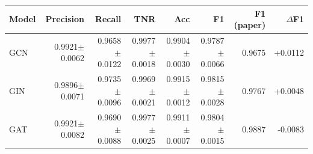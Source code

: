 \begin{tabular}{@{}lrrrrrrr@{}}
\toprule
Model & Precision & Recall & TNR & Acc & F1 & F1 (paper) & $\Delta$F1 \\ \midrule
GCN & 0.9921$\pm$0.0062 & 0.9658$\pm$0.0122 & 0.9977$\pm$0.0018 & 0.9904$\pm$0.0030 & 0.9787$\pm$0.0066 & 0.9675 & +0.0112 \\
GIN & 0.9896$\pm$0.0071 & 0.9735$\pm$0.0096 & 0.9969$\pm$0.0021 & 0.9915$\pm$0.0012 & 0.9815$\pm$0.0028 & 0.9767 & +0.0048 \\
GAT & 0.9921$\pm$0.0082 & 0.9690$\pm$0.0088 & 0.9977$\pm$0.0025 & 0.9911$\pm$0.0007 & 0.9804$\pm$0.0015 & 0.9887 & -0.0083 \\
\bottomrule
\end{tabular}

